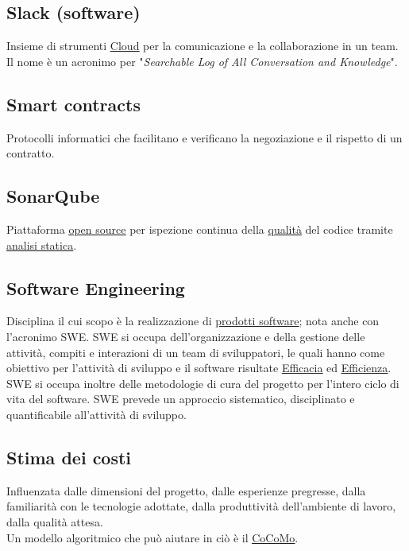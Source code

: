 	\subsection{Slack (software)}
	\label{sec:slacks}
	Insieme di strumenti \underline{\hyperref[sec:cloud]{Cloud}} per la comunicazione e la collaborazione in un team. Il nome è un acronimo per "\emph{Searchable Log of All Conversation and Knowledge}".

	\subsection{Smart contracts}
	\label{sec:smartcontracts}
    Protocolli informatici che facilitano e verificano la negoziazione e il rispetto di un contratto.

	\subsection{SonarQube}
	\label{sec:sonarqube}
	Piattaforma \underline{\hyperref[sec:opensource]{open source}} per ispezione continua della \underline{\hyperref[sec:qualita]{qualità}} del codice tramite \underline{\hyperref[sec:analisistatica]{analisi statica}}.

	\subsection{Software Engineering}
	\label{sec:swe}
	Disciplina il cui scopo è la realizzazione di  \underline{\hyperref[sec:prodottosoftware]{prodotti software}}; nota anche con l'acronimo SWE.
	SWE si occupa dell'organizzazione e della gestione delle attività, compiti e interazioni di un team di sviluppatori,
	le quali hanno come obiettivo per l'attività di sviluppo e il software risultate \underline{\hyperref[sec:efficacia]{Efficacia}} ed \underline{\hyperref[sec:efficienza]{Efficienza}}.
	SWE si occupa inoltre delle metodologie di cura del progetto per l'intero ciclo di vita del software.
	SWE prevede un approccio sistematico, disciplinato e quantificabile all'attività di sviluppo.

	\subsection{Stima dei costi}
	\label{sec:stimacosti}
	Influenzata dalle dimensioni del progetto, dalle esperienze pregresse, dalla familiarità con le tecnologie adottate, dalla produttività dell'ambiente di lavoro, dalla qualità attesa. \\Un modello algoritmico che può aiutare in ciò è il \underline{\hyperref[sec:cocomo]{CoCoMo}}.

